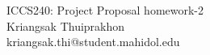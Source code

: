 \documentclass[a4paper, 11pt]{article}
\makeatletter
\newcommand{\myname}{Kriangsak Thuiprakhon}
\newcommand{\myemail}{kriangsak.thi@student.mahidol.edu}
\newcommand{\myhwnum}{homework-2}
\makeatother
\begin{document}
\medskip                        %

\thispagestyle{plain}
\begin{center}                  %
{\Large ICCS240: Project Proposal \myhwnum} \\
\myname \\
\myemail \\
\end{center}
\end{document}
